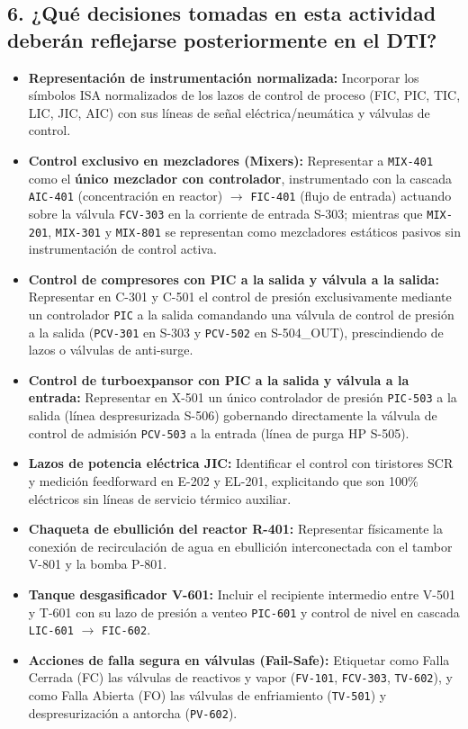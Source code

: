 \documentclass[10pt,letterpaper]{article}
\begin{document}
\subsection*{6. ¿Qué decisiones tomadas en esta actividad deberán reflejarse posteriormente en el DTI?}
\begin{itemize}
    \item \textbf{Representación de instrumentación normalizada:} Incorporar los símbolos ISA normalizados de los lazos de control de proceso (FIC, PIC, TIC, LIC, JIC, AIC) con sus líneas de señal eléctrica/neumática y válvulas de control.
    \item \textbf{Control exclusivo en mezcladores (Mixers):} Representar a \texttt{MIX-401} como el \textbf{único mezclador con controlador}, instrumentado con la cascada \texttt{AIC-401} (concentración en reactor) $\to$ \texttt{FIC-401} (flujo de entrada) actuando sobre la válvula \texttt{FCV-303} en la corriente de entrada S-303; mientras que \texttt{MIX-201}, \texttt{MIX-301} y \texttt{MIX-801} se representan como mezcladores estáticos pasivos sin instrumentación de control activa.
    \item \textbf{Control de compresores con PIC a la salida y válvula a la salida:} Representar en C-301 y C-501 el control de presión exclusivamente mediante un controlador \texttt{PIC} a la salida comandando una válvula de control de presión a la salida (\texttt{PCV-301} en S-303 y \texttt{PCV-502} en S-504\_OUT), prescindiendo de lazos o válvulas de anti-surge.
    \item \textbf{Control de turboexpansor con PIC a la salida y válvula a la entrada:} Representar en X-501 un único controlador de presión \texttt{PIC-503} a la salida (línea despresurizada S-506) gobernando directamente la válvula de control de admisión \texttt{PCV-503} a la entrada (línea de purga HP S-505).
    \item \textbf{Lazos de potencia eléctrica JIC:} Identificar el control con tiristores SCR y medición feedforward en E-202 y EL-201, explicitando que son 100\% eléctricos sin líneas de servicio térmico auxiliar.
    \item \textbf{Chaqueta de ebullición del reactor R-401:} Representar físicamente la conexión de recirculación de agua en ebullición interconectada con el tambor V-801 y la bomba P-801.
    \item \textbf{Tanque desgasificador V-601:} Incluir el recipiente intermedio entre V-501 y T-601 con su lazo de presión a venteo \texttt{PIC-601} y control de nivel en cascada \texttt{LIC-601} $\to$ \texttt{FIC-602}.
    \item \textbf{Acciones de falla segura en válvulas (Fail-Safe):} Etiquetar como Falla Cerrada (FC) las válvulas de reactivos y vapor (\texttt{FV-101}, \texttt{FCV-303}, \texttt{TV-602}), y como Falla Abierta (FO) las válvulas de enfriamiento (\texttt{TV-501}) y despresurización a antorcha (\texttt{PV-602}).
\end{itemize}
\end{document}
